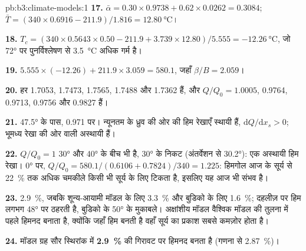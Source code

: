 \begin{solution}{pb:b3:climate-models:1}
\textbf{17.} $\bar\alpha = 0.30\times0.9738 + 0.62\times0.0262 =
\num{0.3084}$; $\bar T = (340\times0.6916 - 211.9)/1.816 =
\qty{12.80}{\celsius}$।

\textbf{18.} $T_c = (340\times0.5643\times0.50 - 211.9 + 3.739\times12.80)/
5.555 = \qty{-12.26}{\celsius}$, जो \ang{72} पर पुनर्विश्लेषण से
\qty{3.5}{\celsius} अधिक गर्म है।

\textbf{19.} $5.555\times(-12.26) + 211.9\times3.059 = \num{580.1}$, जहाँ
$\beta/B = \num{2.059}$।

\textbf{20.} हर 1.7053, 1.7473, 1.7565, 1.7488 और
1.7362 हैं, और $Q/Q_0 = \num{1.0005}$, \num{0.9764}, \num{0.9713},
\num{0.9756} और \num{0.9827} हैं।

\textbf{21.} \ang{47.5} के पास, \num{0.971} पर। न्यूनतम के ध्रुव की ओर की हिम रेखाएँ
स्थायी हैं, $\mathrm dQ/\mathrm dx_s > 0$; भूमध्य रेखा की ओर वाली
अस्थायी हैं।

\textbf{22.} $Q/Q_0 = 1$ \ang{30} और \ang{40} के बीच भी है, \ang{30} के निकट
(अंतर्वेशन से \ang{30.2}): एक अस्थायी हिम रेखा। \ang{0} पर,
$Q/Q_0 = 580.1/(0.6106 + 0.7824)/340 = \num{1.225}$: हिमगोल आज के
सूर्य से \qty{22}{\percent} तक अधिक चमकीले किसी भी सूर्य के लिए टिकता है, इसलिए
यह आज भी संभव है।

\textbf{23.} \qty{2.9}{\percent}, जबकि शून्य-आयामी मॉडल के लिए \qty{3.3}{\percent} और
बुडिको के लिए \qty{1.6}{\percent}; दहलीज़ पर हिम लगभग \ang{48} पर ठहरती है,
बुडिको के \ang{50} के मुकाबले। अक्षांशीय मॉडल
वैश्विक मॉडल की तुलना में पहले हिमनद बनाता है, क्योंकि जहाँ हिम बनती है
वहाँ सूर्य का प्रकाश सबसे कमज़ोर होता है।

\textbf{24.} मॉडल ग्रह सौर स्थिरांक में
\textbf{\qty[text-series-to-math=true]{2.9}{\percent}} की गिरावट पर हिमनद बनता है
(गणना से \qty{2.87}{\percent})।
\end{solution}
